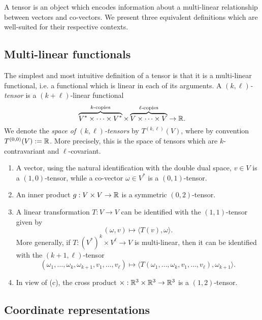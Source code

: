 A tensor is an object which encodes information about a multi-linear relationship between vectors and co-vectors. We present three equivalent definitions which are well-suited for their respective contexts. 



\subsection{Multi-linear functionals}

The simplest and most intuitive definition of a tensor is that it is a multi-linear functional, i.e. a functional which is linear in each of its arguments. A \emph{$(k, \ell)$-tensor} is a $(k + \ell)$-linear functional
	\[ \overbrace{V^* \times \dots \times V^*}^{\text{$k$-copies}} \times \overbrace{V \times \dots \times V}^{\text{$\ell$-copies}}  \to \mathbb R. \]
We denote the \emph{space of $(k, \ell)$-tensors} by $T^{(k, \ell)} (V)$, where by convention $T^{(0, 0)} (V) := \mathbb R$. More precisely, this is the space of tensors which are $k$-contravariant and $\ell$-covariant. 

\begin{example}
\leavevmode
\begin{enumerate}
	\item A vector, using the natural identification with the double dual space, $v\in V$ is a $(1, 0)$-tensor, while a co-vector $\omega \in V^{*}$ is a $(0, 1)$-tensor. 
	
	\item An inner product $ g: V \times V \to \mathbb R$ is a symmetric $(0, 2)$-tensor. 
	
	\item A linear transformation $T : V \to V$ can be identified with the $(1, 1)$-tensor given by 
			\[ (\omega, v) \mapsto \langle T(v), \omega \rangle.\]
		More generally, if $T: (V^*)^k \times V^\ell \to V$ is multi-linear, then it can be identified with the $(k + 1, \ell)$-tensor
			\[ (\omega_1, \dots, \omega_k, \omega_{k + 1}, v_1, \dots, v_\ell) \mapsto \langle T(\omega_1, \dots, \omega_k, v_1, \dots, v_\ell) , \omega_{k + 1}\rangle .\]
		
	
	\item In view of (c), the cross product $\times : \mathbb R^3 \times \mathbb R^3 \to \mathbb R^3$ is a $(1, 2)$-tensor. 

\end{enumerate}
\end{example}


\subsection{Coordinate representations}

